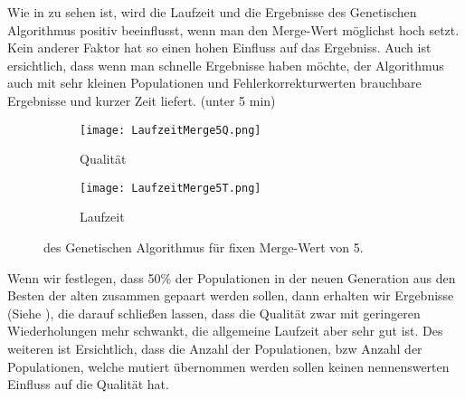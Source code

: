 Wie in  zu sehen ist, wird die Laufzeit und die Ergebnisse des Genetischen Algorithmus positiv beeinflusst,
wenn man den Merge-Wert möglichst hoch setzt. Kein anderer Faktor hat so einen hohen Einfluss auf das Ergebniss.
Auch ist ersichtlich, dass wenn man schnelle Ergebnisse haben möchte, der Algorithmus auch mit sehr kleinen
Populationen und Fehlerkorrekturwerten brauchbare Ergebnisse und kurzer Zeit liefert. (unter 5 min)

\begin{figure}
  \begin{subfigure}[b]{\textwidth}
  \texttt{[image: LaufzeitMerge5Q.png]}
  \caption{Qualität}
  \label{fig:QualitätMerge5}
  \end{subfigure}

  \begin{subfigure}[b]{\textwidth}
  \texttt{[image: LaufzeitMerge5T.png]}
  \caption{Laufzeit}
  \label{fig:LaufzeitMerge5}
  \end{subfigure}
\caption{des Genetischen Algorithmus für fixen Merge-Wert von 5.\protect}
\label{fig:GenAlgMerge5}
\end{figure}

Wenn wir festlegen, dass 50\% der Populationen in der neuen Generation aus den Besten der alten zusammen gepaart werden sollen,
dann erhalten wir Ergebnisse (Siehe ), die darauf schließen lassen, dass die Qualität zwar mit geringeren Wiederholungen
mehr schwankt, die allgemeine Laufzeit aber sehr gut ist.
Des weiteren ist Ersichtlich, dass die Anzahl der Populationen, bzw Anzahl der Populationen, welche mutiert übernommen werden sollen
keinen nennenswerten Einfluss auf die Qualität hat.

